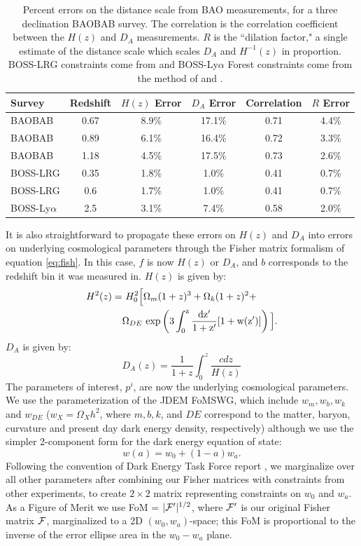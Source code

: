 \documentclass[10pt,iop]{emulateapj}
\begin{document}
\begin{table}[ht]\centering
\caption{Percent errors on the distance scale from BAO measurements,  
for a three declination BAOBAB survey.
The correlation is the correlation coefficient between the $H(z)$ and $D_A$ measurements.  
$R$ is the ``dilation factor," a single estimate of
the distance scale which scales $D_A$ and $H^{-1}(z)$ in proportion.
BOSS-LRG constraints come from
\citet{schlegel_et_al_2009} and BOSS-Ly$\alpha$ Forest constraints come from the method of
\citet{mcdonald_and_eisenstein_2007} and \citet{dawson_et_al_2012}.}
\begin{tabular}{l|ccccc}
Survey & Redshift & $H(z)$ Error & $D_A$ Error & Correlation & $R$ Error\\
\hline\hline
BAOBAB & 0.67 & 8.9\% & 17.1\% & 0.71 & 4.4\% \\
BAOBAB & 0.89 & 6.1\% & 16.4\% & 0.72 & 3.3\% \\
BAOBAB & 1.18 & 4.5\% & 17.5\% & 0.73 & 2.6\% \\
\hline
BOSS-LRG & 0.35 & 1.8\% & 1.0\% & 0.41 & 0.7\% \\
BOSS-LRG & 0.6 & 1.7\% & 1.0\% & 0.41 & 0.7\% \\
\hline
BOSS-Ly$\alpha$ & 2.5 & 3.1\% & 7.4\% & 0.58 & 2.0\% \\
\end{tabular}
\label{tab:constraints}
\end{table}

It is also straightforward to propagate these errors on $H(z)$ and $D_A$ into errors on underlying
cosmological parameters through the Fisher matrix formalism of equation \ref{eq:fish}.
In this case, $f$ is now $H(z)$ or $D_A$, and $b$ corresponds to the redshift bin it was measured in.
$H(z)$ is given by:
\begin{align}
H^2(z) = &\ H_0^2\Big[ \Omega_m(1+z)^3 + \Omega_k(1+z)^2 + \nonumber \\
& \Omega_{DE}\ \rm{exp}\left(3\int_0^z\frac{dz'}{1+z'}[1+w(z')]\right)\Big].
\end{align}
$D_A$ is given by:
\begin{equation}
D_A(z) = \frac{1}{1+z}\int_0^z\frac{cdz}{H(z)}
\end{equation}
The parameters of interest, $p^i$, are now the underlying cosmological parameters.  We use
the parameterization of the JDEM FoMSWG, 
which include $w_m, w_b, w_k$ and $w_{DE}$ 
($w_X = \Omega_Xh^2$, where $m, b, k$, and $DE$ correspond to the matter, baryon, curvature and
present day dark energy density, respectively) although we use the simpler 2-component form
for the dark energy equation of state:
\begin{equation}
w(a) = w_0 + (1-a)w_a.
\end{equation}
Following the convention of Dark Energy Task Force report 
\citep{albrecht_et_al_2006}, we marginalize over all other parameters after combining 
our Fisher matrices with constraints from other experiments, to create $2\times2$ matrix representing
constraints on $w_0$ and $w_a$.  
As a Figure of Merit we use FoM = $|{\cal F'}|^{1/2}$, where $\cal F'$
is our original Fisher matrix $\cal F$, marginalized to a 2D $(w_0,w_a)$-space; this FoM
is proportional to the inverse of the error ellipse area in the $w_0-w_a$ plane.
\end{document}
